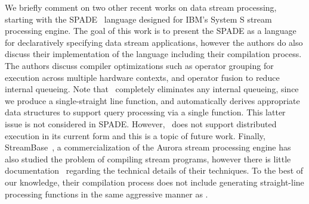 We briefly comment on two other recent works on data stream processing, starting
with the SPADE~\cite{gedik-sigmod:08} language designed for IBM's System S stream
processing engine. The goal of this work is to present the SPADE as a language
for declaratively specifying data stream applications, however the authors do
also discuss their implementation of the language including their compilation
process. The authors discuss compiler optimizations such as operator grouping for
execution across multiple hardware contexts, and operator fusion to reduce
internal queueing. Note that \compiler\ completely eliminates any internal
queueing, since we produce a single-straight line function, and automatically
derives appropriate data structures to support query processing via a single
function. This latter issue is not considered in SPADE. However, \compiler\ does
not support distributed execution in its current form and this is a topic of
future work. Finally, StreamBase~\cite{streambase}, a commercialization of the
Aurora stream processing engine has also studied the problem of compiling stream
programs, however there is little documentation~\cite{sb-patent} regarding the
technical details of their techniques. To the best of our knowledge, their
compilation process does not include generating straight-line processing
functions in the same aggressive manner as \compiler.



